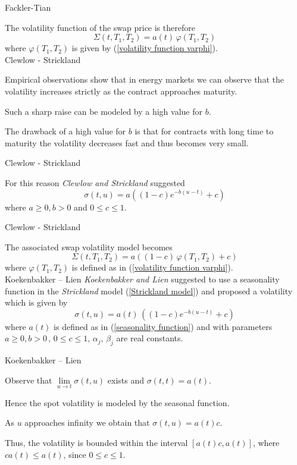{Fackler-Tian}

The volatility function of the swap price is therefore
\begin{equation}
\Sigma(t,T_1,T_2)=a(t)\, \varphi(T_1,T_2)
\end{equation}
where $\varphi(T_1,T_2)$ is given by (\ref{volatility function varphi}).\\

{Clewlow - Strickland}
\item<1-> Empirical observations show that in energy markets we can observe that the volatility increases strictly as the contract approaches maturity.
\item<2-> Such a sharp raise can be modeled by a high value for $b$.
\item<3-> The drawback of a high value for $b$ is that for contracts with long time to maturity the volatility decreases fast and thus becomes very small.

{Clewlow - Strickland}

For this reason \emph{Clewlow and Strickland} suggested
\begin{equation}
\sigma(t,u)=a((1-c)e^{-b(u-t)}+c) \label{Strickland model}
\end{equation}
where $a\ge 0, b > 0$ and $ 0 \le c\le 1$.

{Clewlow - Strickland}

The associated swap volatility model becomes
\begin{equation}
\Sigma(t,T_1,T_2)=a((1-c)\,\varphi(T_1,T_2)+c)
\end{equation}
where $\varphi(T_1,T_2)$ is defined as in (\ref{volatility function varphi}).\\

{Koekenbakker -- Lien}
\emph{Koekenbakker and Lien} suggested to use a seasonality function in the \emph{Strickland} model (\ref{Strickland model}) and proposed a volatility which is given by
\begin{equation}
\sigma(t,u)=a(t)\, ((1-c)e^{-b(u-t)}+c)
\end{equation}
where $a(t)$ is defined as in (\ref{seasonality function}) and with parameters $a \ge 0, b > 0\, ,\, 0 \le c \le 1, \,\alpha_j, \, \beta_j$ are real constants.

{Koekenbakker -- Lien}
\item<1-> Observe that $\lim \limits_{u \to t} \sigma(t,u)$ exists and $\sigma(t,t)=a(t)$.
\item<2-> Hence the spot volatility is modeled by the seasonal function.
\item<3-> As $u$ approaches infinity we obtain that $\sigma(t,u)=a(t)c$.
\item<4-> Thus, the volatility is bounded within the interval $[a(t)c, a(t)]$, where $ca(t) \le a(t)$, since $0 \le c \le 1$.\\

